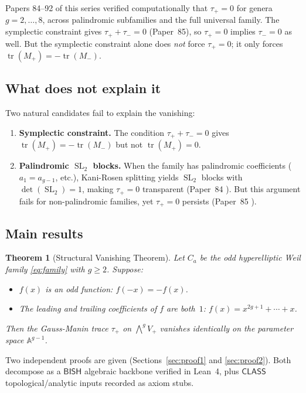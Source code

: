 \documentclass[11pt]{article}
\theoremstyle{plain}
\newtheorem{theorem}{Theorem}[section]
\theoremstyle{definition}
\theoremstyle{remark}
\newcommand{\SL}{\operatorname{SL}}
\newcommand{\tr}{\operatorname{tr}}
\newcommand{\BISH}{\mathsf{BISH}}
\newcommand{\CLASS}{\mathsf{CLASS}}
\begin{document}
Papers 84--92 of this series \cite{p84,p85,p89,p92} verified computationally that
$\tau_+ = 0$ for genera $g = 2, \ldots, 8$, across palindromic
subfamilies and the full universal family.
The symplectic constraint gives $\tau_+ + \tau_- = 0$ (Paper~85),
so $\tau_+ = 0$ implies $\tau_- = 0$ as well.
But the symplectic constraint alone does \emph{not} force $\tau_+ = 0$;
it only forces $\tr(M_+) = -\tr(M_-)$.

\subsection{What does not explain it}

Two natural candidates fail to explain the vanishing:

\begin{enumerate}[label=(\roman*)]
\item \textbf{Symplectic constraint.} The condition $\tau_+ + \tau_- = 0$
  gives $\tr(M_+) = -\tr(M_-)$ but not $\tr(M_+) = 0$.
\item \textbf{Palindromic $\SL_2$ blocks.} When the family has palindromic
  coefficients ($a_1 = a_{g-1}$, etc.), Kani-Rosen splitting yields
  $\SL_2$ blocks with $\det(\SL_2) = 1$, making $\tau_+ = 0$ transparent
  (Paper~84 \cite{p84}). But this argument fails for non-palindromic families,
  yet $\tau_+ = 0$ persists (Paper~85 \cite{p85}).
\end{enumerate}

\subsection{Main results}

\begin{theorem}[Structural Vanishing Theorem]\label{thm:main}
  Let $C_a$ be the odd hyperelliptic Weil family \eqref{eq:family} with
  $g \geq 2$.  Suppose:
  \begin{itemize}
    \item[\textup{(A)}] $f(x)$ is an odd function: $f(-x) = -f(x)$.
    \item[\textup{(B)}] The leading and trailing coefficients of $f$ are
      both~$1$: $f(x) = x^{2g+1} + \cdots + x$.
  \end{itemize}
  Then the Gauss-Manin trace $\tau_+$ on $\bigwedge^g V_+$ vanishes
  identically on the parameter space $\mathbb{A}^{g-1}$.
\end{theorem}

Two independent proofs are given (Sections~\ref{sec:proof1} and \ref{sec:proof2}).
Both decompose as a $\BISH$ algebraic backbone verified in Lean~4,
plus $\CLASS$ topological/analytic inputs recorded as axiom stubs.
\end{document}
